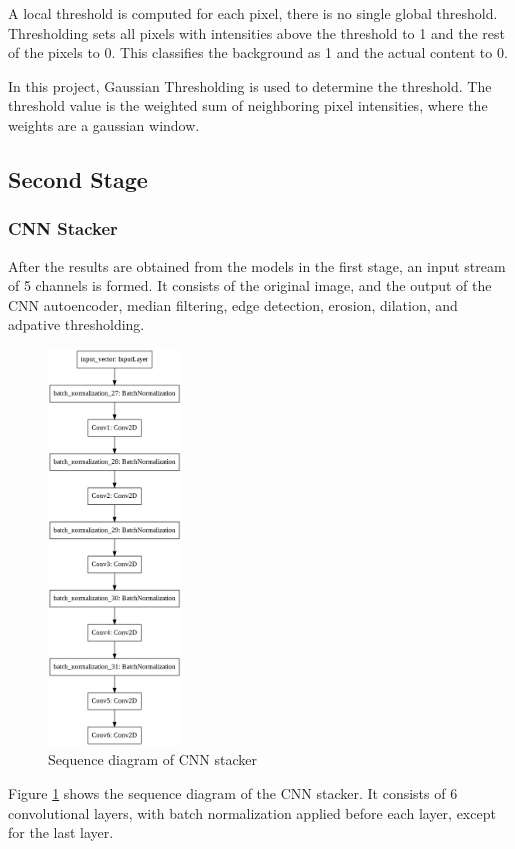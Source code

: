 \documentclass[10pt,twocolumn,letterpaper]{article}
\begin{document}
    A local threshold is computed for each pixel, there is no single global threshold. Thresholding sets all pixels with intensities above the threshold to 1 and the rest of the pixels to 0. This classifies the background as 1 and the actual content to 0.

    In this project, Gaussian Thresholding is used to determine the threshold. The threshold value is the weighted sum of neighboring pixel intensities, where the weights are a gaussian window.


\subsection{Second Stage}
\subsubsection{CNN Stacker}

    After the results are obtained from the models in the first stage, an input stream of 5 channels is formed. It consists of the original image, and the output of the CNN autoencoder, median filtering, edge detection, erosion, dilation, and adpative thresholding. 

\begin{figure}[h!]
    \centering
    \includegraphics[width=100pt]{images/stacker.png}
    \caption{Sequence diagram of CNN stacker}
    \label{fig:stacker}
\end{figure}


    Figure \ref{fig:stacker} shows the sequence diagram of the 
    CNN stacker. It consists of 6 convolutional layers, with batch normalization applied before each layer, except for the last layer.
\end{document}
